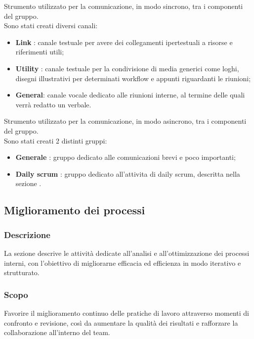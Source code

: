 Strumento utilizzato per la comunicazione, in modo sincrono, tra i componenti
del gruppo.\\ Sono stati creati diversi canali:
\begin{itemize}
    \item \textbf{Link} : canale testuale per avere dei collegamenti ipertestuali a risorse e riferimenti utili;
    \item \textbf{Utility} : canale testuale per la condivisione di media generici come loghi, disegni illustrativi per determinati workflow e appunti riguardanti le riunioni;
    \item \textbf{General}: canale vocale dedicato alle riunioni interne, al termine delle quali verrà redatto un verbale.
\end{itemize}

Strumento utilizzato per la comunicazione, in modo asincrono, tra i componenti
del gruppo.\\ Sono stati creati 2 distinti gruppi:
\begin{itemize}
    \item \textbf{Generale} : gruppo dedicato alle comunicazioni brevi e poco importanti;
    \item \textbf{Daily scrum} : gruppo dedicato all'attivita di daily scrum, descritta nella sezione .
\end{itemize}

\subsection{Miglioramento dei processi}

\subsubsection{Descrizione}
La sezione descrive le attività dedicate all’analisi e all’ottimizzazione 
dei processi interni, con l’obiettivo di migliorarne efficacia ed efficienza 
in modo iterativo e strutturato.

\subsubsection{Scopo}
Favorire il miglioramento continuo delle pratiche di lavoro attraverso 
momenti di confronto e revisione, così da aumentare la qualità dei risultati 
e rafforzare la collaborazione all’interno del team.


